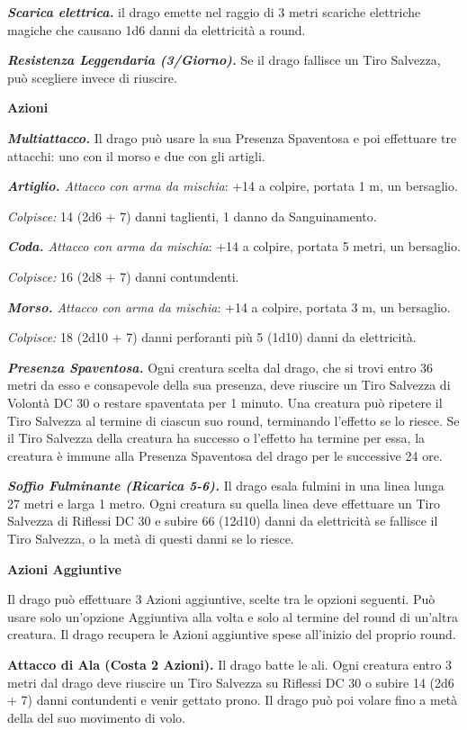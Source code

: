 \begin{multicols}{2}
{\emph{\textbf{Scarica elettrica.}} il drago emette nel raggio di 3 metri scariche elettriche magiche che causano 1d6 danni da elettricità a round.

\emph{\textbf{Resistenza Leggendaria (3/Giorno).}} Se il drago fallisce un Tiro Salvezza, può scegliere invece di riuscire.

\textbf{Azioni}

\emph{\textbf{Multiattacco.}} Il drago può usare la sua Presenza Spaventosa e poi effettuare tre attacchi: uno con il morso e due con gli artigli.

\emph{\textbf{Artiglio.} Attacco con arma da mischia}: +14 a colpire, portata 1 m, un bersaglio.

\emph{Colpisce:} 14 (2d6 + 7) danni taglienti, 1 danno da Sanguinamento.

\emph{\textbf{Coda.} Attacco con arma da mischia}: +14 a colpire, portata 5 metri, un bersaglio.

\emph{Colpisce:} 16 (2d8 + 7) danni contundenti.

\emph{\textbf{Morso.} Attacco con arma da mischia}: +14 a colpire, portata 3 m, un bersaglio.

\emph{Colpisce:} 18 (2d10 + 7) danni perforanti più 5 (1d10) danni da elettricità.

\emph{\textbf{Presenza Spaventosa.}} Ogni creatura scelta dal drago, che si trovi entro 36 metri da esso e consapevole della sua presenza, deve riuscire un Tiro Salvezza di Volontà DC 30 o restare spaventata per 1 minuto. Una creatura può ripetere il Tiro Salvezza al termine di ciascun suo round, terminando l'effetto se lo riesce. Se il Tiro Salvezza della creatura ha successo o l'effetto ha termine per essa, la creatura è immune alla Presenza Spaventosa del drago per le successive 24 ore.

\emph{\textbf{Soffio Fulminante (Ricarica 5-6).}} Il drago esala fulmini in una linea lunga 27 metri e larga 1 metro. Ogni creatura su quella linea deve effettuare un Tiro Salvezza di Riflessi DC 30 e subire 66 (12d10) danni da elettricità se fallisce il Tiro Salvezza, o la metà di questi danni se lo riesce.

\textbf{Azioni Aggiuntive}

Il drago può effettuare 3 Azioni aggiuntive, scelte tra le opzioni seguenti. Può usare solo un'opzione Aggiuntiva alla volta e solo al termine del round di un'altra creatura. Il drago recupera le Azioni aggiuntive spese all'inizio del proprio round.

\textbf{Attacco di Ala (Costa 2 Azioni).} Il drago batte le ali. Ogni creatura entro 3 metri dal drago deve riuscire un Tiro Salvezza su Riflessi DC 30 o subire 14 (2d6 + 7) danni contundenti e venir gettato prono. Il drago può poi volare fino a metà della del suo movimento di volo.

}
\end{multicols}
